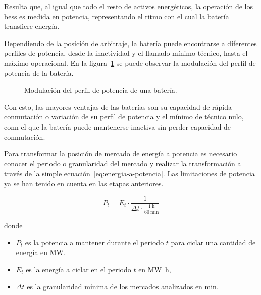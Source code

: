 Resulta que, al igual que todo el resto de activos energéticos, la operación de los \gls{bess} es medida en potencia, representando el ritmo con el cual la batería transfiere energía.

Dependiendo de la posición de arbitraje, la batería puede encontrarse a diferentes perfiles de potencia, desde la inactividad y el llamado mínimo técnico, hasta el máximo operacional. En la figura~\ref{fig:perfil-potencia} se puede observar la modulación del perfil de potencia de la batería.

\begin{figure}
  \centering
  \caption[Modulación del perfil de potencia de una batería.]{Modulación del perfil de potencia de una batería.}
  \label{fig:perfil-potencia}
\end{figure}

Con esto, las mayores ventajas de las baterías son su capacidad de rápida conmutación o variación de su perfil de potencia y el mínimo de técnico nulo, conn el que la batería puede mantenerse inactiva sin perder capacidad de conmutación.

Para transformar la posición de mercado de energía a potencia es necesario conocer el periodo o granularidad del mercado y realizar la transformación a través de la simple ecuación~\ref{eq:energia-a-potencia}. Las limitaciones de potencia ya se han tenido en cuenta en las etapas anteriores.

\begin{samepage}

  \begin{equation}
    \label{eq:energia-a-potencia}
    P_{t} = E_{t} \cdot \frac{1}{\Delta t \cdot \frac{\SI{1}{\hour}}{\SI{60}{\minute}}}
  \end{equation}

  donde

  \begin{itemize}

    \item \( P_{t} \) es la potencia a mantener durante el periodo \( t \) para ciclar una cantidad de energía en \si{\mega\watt}.

    \item \( E_{t} \) es la energía a ciclar en el periodo \( t \) en \si{{\mega\watt\hour}},

    \item \( \Delta t \) es la granularidad mínima de los mercados analizados en \si{\minute}.

  \end{itemize}

\end{samepage}

